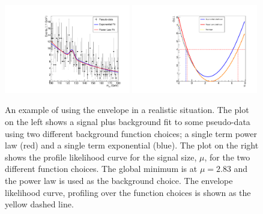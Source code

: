 \begin{figure}
  \begin{center}
    \includegraphics[width=0.49\textwidth]{analysis/plots/envelope_explain2.pdf}
    \includegraphics[width=0.49\textwidth]{analysis/plots/envelope_explain3.pdf}
    \caption[A toy example of using the envelope method for estimating the background]{An example of using the envelope in a realistic situation. The plot on the left shows a signal plus background fit to some pseudo-data using two different background function choices; a single term power law (red) and a single term exponential (blue). The plot on the right shows the profile likelihood curve for the signal size, $\mu$, for the two different function choices. The global minimum is at $\mu=2.83$ and the power law is used as the background choice. The envelope likelihood curve, profiling over the function choices is shown as the yellow dashed line.}
    \label{fig:envelope_explain2}
  \end{center}
\end{figure}

